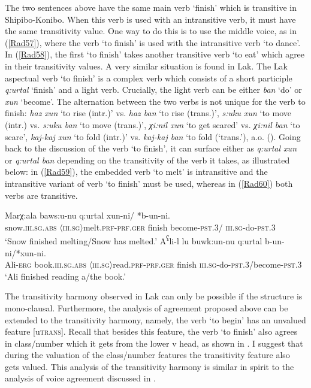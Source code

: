\documentclass[output=paper]{langscibook}
\begin{document}
The two sentences above have the same main verb ‘finish’ which is transitive in Shipibo-Konibo. When this verb is used with an intransitive verb, it must have the same transitivity value. One way to do this is to use the middle voice, as in (\ref{Rad57}), where the verb ‘to finish’ is used with the intransitive verb ‘to dance’. In (\ref{Rad58}), the first ‘to finish’ takes another transitive verb ‘to eat’ which agree in their transitivity values.
A very similar situation is found in Lak. The Lak aspectual verb ‘to finish’ is a complex verb which consists of a short participle \textit{q:urtal} ‘finish’ and a light verb.  Crucially, the light verb can be either \textit{ban} ‘do’ or \textit{xun} ‘become’. The alternation between the two verbs is not unique for the verb to finish: \textit{haz xun} ‘to rise (intr.)’ vs. \textit{haz ban} ‘to rise (trans.)’, \textit{s:uku xun} ‘to move (intr.) vs. \textit{s:uku ban} ‘to move (trans.)’, \textit{χi:nil xun} ‘to get scared’ vs. \textit{χi:nil ban} ‘to scare’, \textit{kaj-kaj xun} ‘to fold (intr.)’ vs. \textit{kaj-kaj ban} ‘to fold (‘trans.’), a.o. (\citealt[42]{Eldarova1995}). Going back to the discussion of the verb ‘to finish’, it can surface either as \textit{q:urtal xun} or \textit{q:urtal ban} depending on the transitivity of the verb it takes, as illustrated below: in (\ref{Rad59}), the embedded verb ‘to melt’ is intransitive and the intransitive variant of verb ‘to finish’ must be used, whereas in (\ref{Rad60}) both verbs are transitive.

\ea\label{Rad59}
\gll Marχ:ala baws:u-nu q:urtal xun-ni/ *b-un-ni.\\
 snow.\textsc{iii.sg.abs} \textsc{〈iii.sg〉}melt.\textsc{prf-prf.ger} finish become-\textsc{pst.3}/ \textsc{iii.sg}-do-\textsc{pst.3}\\
\glt ‘Snow finished melting/Snow has melted.’
\ex\label{Rad60}
\gll A\textsuperscript{ʕ}li-l lu buwk:un-nu q:urtal b-un-ni/*xun-ni.\\
Ali-\textsc{erg} book.\textsc{iii.sg.abs} \textsc{〈iii.sg〉}read.\textsc{prf-prf.ger} finish \textsc{iii.sg}-do-\textsc{pst.3}/become-\textsc{pst.3}\\
\glt ‘Ali finished reading a/the book.’
\z 

The transitivity harmony observed in Lak can only be possible if the structure is mono-clausal. Furthermore, the analysis of agreement proposed above can be extended to the transitivity harmony, namely, the verb ‘to begin’ has an unvalued feature [u\textsc{trans}]. Recall that besides this feature, the verb ‘to finish’ also agrees in class/number which it gets from the lower v head, as shown in . I suggest that during the valuation of the class/number features the transitivity feature also gets valued. This analysis of the transitivity harmony is similar in spirit to the analysis of voice agreement discussed in \citet{WurmbrandShimamura2017}.
\end{document}

